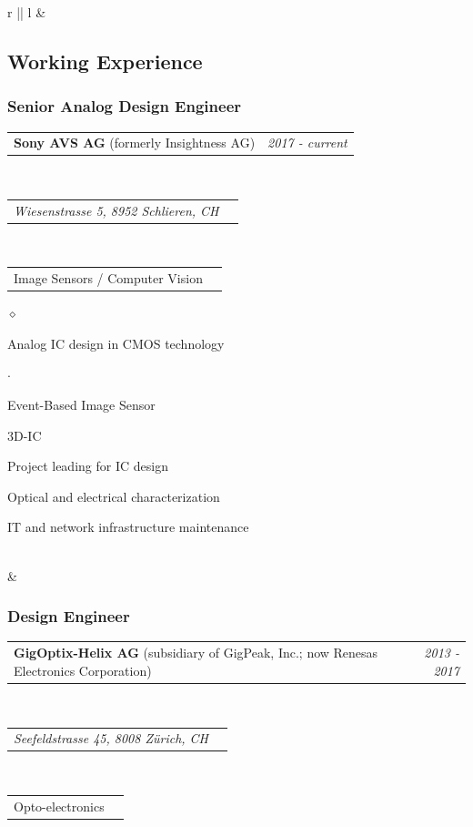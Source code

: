 \documentclass[a4paper]{article}
\makeatletter
\newlength{\sectsep}
\newlength{\subsectsep}
\newcommand{\headerrow}[2]
{\begin{tabular*}{\textwidth}{l@{\extracolsep{\fill}}r}
	#1 &
	#2 \\
\end{tabular*}}
\renewenvironment{itemize}{
  \begin{list}{$\diamond$}{
    \setlength{\topsep}{0.25em}
    \setlength{\itemsep}{0em}
    \setlength{\parskip}{0pt}
    \setlength{\parsep}{0em}
  }
}{
  \end{list}
}
\newenvironment{itemize2}{
  \begin{list}{$\cdot$}{
    \setlength{\topsep}{0.25em}
    \setlength{\itemsep}{0em}
    \setlength{\parskip}{0pt}
    \setlength{\parsep}{0em}
  }
}{
  \end{list}
}
\makeatother
\begin{document}
\begin{longtable}{r || l}
  & \begin{minipage}{0.9\textwidth}
      \vspace{\sectsep}
      \subsection*{Working Experience}
      \subsubsection*{Senior Analog Design Engineer}
      \headerrow
  		{\textbf{Sony AVS AG} (formerly Insightness AG)}{\emph{2017 - current}}
      \\
      \headerrow
        {\emph{Wiesenstrasse 5, 8952 Schlieren, CH}}{}
      \\
      \headerrow
        {Image Sensors / Computer Vision}{}

      \begin{itemize}
          \item Analog IC design in CMOS technology
          \begin{itemize2}
              \item Event-Based Image Sensor
              \item 3D-IC
          \end{itemize2}
          \item Project leading for IC design
          \item Optical and electrical characterization
          \item IT and network infrastructure maintenance
      \end{itemize}
  \end{minipage} \\[\sectsep]

  & \begin{minipage}{0.9\textwidth}
      \vspace{\subsectsep}
      \subsubsection*{Design Engineer}
      \headerrow
  		{\textbf{GigOptix-Helix AG} (subsidiary of GigPeak, Inc.; now Renesas Electronics Corporation)}{\emph{2013 - 2017}}
      \\
      \headerrow
        {\emph{Seefeldstrasse 45, 8008 Zürich, CH}}{}
      \\
      \headerrow
        {Opto-electronics}{}


\end{minipage}
\end{longtable}
\end{document}
